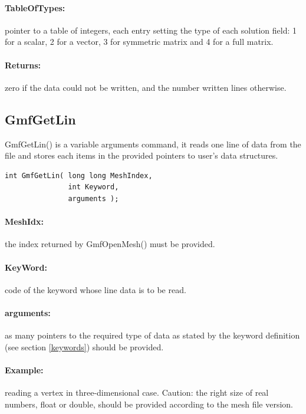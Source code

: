 \documentclass[a4paper,12pt]{article}
\begin{document}
\paragraph{TableOfTypes:} pointer to a table of integers, each entry setting the type of each solution field: 1 for a scalar, 2 for a vector, 3 for symmetric matrix and 4 for a full matrix.

\paragraph{Returns:} zero if the data could not be written, and the number written lines otherwise.


\subsection{GmfGetLin}
GmfGetLin() is a variable arguments command, it reads one line of data from the file and stores each items in the provided pointers to user's data structures.

\begin{tt}
\begin{verbatim}
int GmfGetLin( long long MeshIndex,
               int Keyword,
               arguments );
\end{verbatim}
\end{tt}
\normalfont

\paragraph{MeshIdx:}
the index returned by GmfOpenMesh() must be provided.

\paragraph{KeyWord:} code of the keyword whose line data is to be read.

\paragraph{arguments:} as many pointers to the required type of data as stated by the keyword definition (see section \ref{keywords}) should be provided.

\paragraph{Example:} reading a vertex in three-dimensional case. Caution: the right size of real numbers, float or double, should be provided according to the mesh file version.
\end{document}

